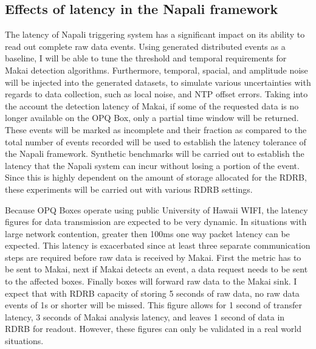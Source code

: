 \subsection{Effects of latency in the Napali framework} \label{iexp:sec:lat}
The latency of Napali triggering system has a significant impact on its ability to read out complete raw data events. Using generated distributed events as a baseline, I will be able to tune the threshold and temporal requirements for Makai detection algorithms. Furthermore, temporal, spacial, and amplitude noise will be injected into the generated datasets, to simulate various uncertainties with regards to data collection, such as local noise, and NTP offset errors. Taking into the account the detection latency of Makai, if some of the requested data is no longer available on the OPQ Box, only a partial time window will be returned. These events will be marked as incomplete and their fraction as compared to the total number of events recorded will be used to establish the latency tolerance of the Napali framework. Synthetic benchmarks will be carried out to establish the latency that the Napali system can incur without losing a portion of the event. Since this is highly dependent on the amount of storage allocated for the RDRB, these experiments will be carried out with various RDRB settings.

Because OPQ Boxes operate using public University of Hawaii WIFI, the latency figures for data transmission are expected to be very dynamic. In situations with large network contention, greater then 100ms one way packet latency can be expected. This latency is exacerbated since at least three separate communication steps are required before raw data is received by Makai. First the metric has to be sent to Makai, next if Makai detects an event, a data request needs to be sent to the affected boxes. Finally boxes will forward raw data to the Makai sink. I expect that with RDRB capacity of storing 5 seconds of raw data, no raw data events of 1s or shorter will be missed. This figure allows for 1 second of transfer latency, 3 seconds of Makai analysis latency, and leaves 1 second of data in RDRB for readout. However, these figures can only be validated in a real world situations.

